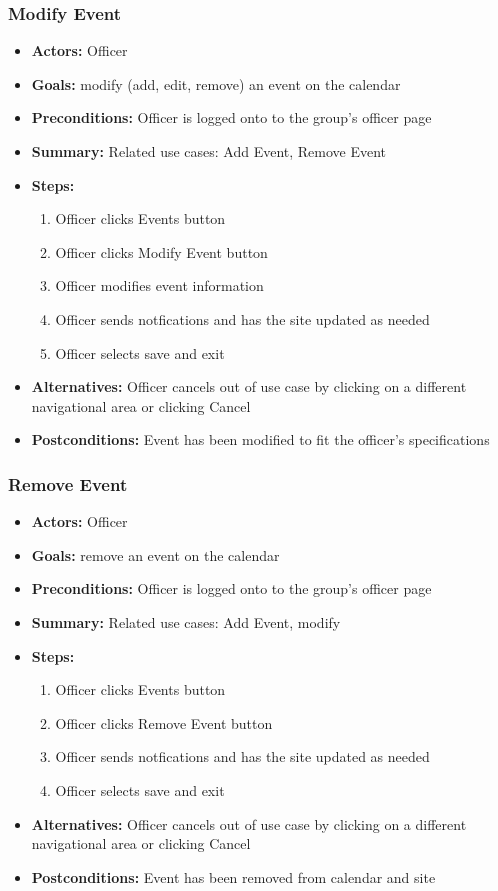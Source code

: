 		\subsubsection{Modify Event}
			\begin{itemize}
				\item{\textbf{Actors:} Officer}
				\item{\textbf{Goals:} modify (add, edit, remove) an event on the calendar}
				\item{\textbf{Preconditions:} Officer is logged onto to the group's officer page}
				\item{\textbf{Summary:} Related use cases: Add Event, Remove Event}
				\item{\textbf{Steps:}
				\begin{enumerate}
					\item{Officer clicks Events button}
					\item{Officer clicks Modify Event button}
					\item{Officer modifies event information}
					\item{Officer sends notfications and has the site updated as needed}
					\item{Officer selects save and exit}
				\end{enumerate}
				}
				\item{\textbf{Alternatives:} Officer cancels out of use case by clicking on a different navigational area or clicking Cancel}
				\item{\textbf{Postconditions:} Event has been modified to fit the officer's specifications}
			\end{itemize}
			\subsubsection{Remove Event}
			\begin{itemize}
				\item{\textbf{Actors:} Officer}
				\item{\textbf{Goals:} remove an event on the calendar}
				\item{\textbf{Preconditions:} Officer is logged onto to the group's officer page}
				\item{\textbf{Summary:} Related use cases: Add Event, modify}
				\item{\textbf{Steps:}
				\begin{enumerate}
					\item{Officer clicks Events button}
					\item{Officer clicks Remove Event button}
					\item{Officer sends notfications and has the site updated as needed}
					\item{Officer selects save and exit}
				\end{enumerate}
				}
				\item{\textbf{Alternatives:} Officer cancels out of use case by clicking on a different navigational area or clicking Cancel}
				\item{\textbf{Postconditions:} Event has been removed from calendar and site}
			\end{itemize}
